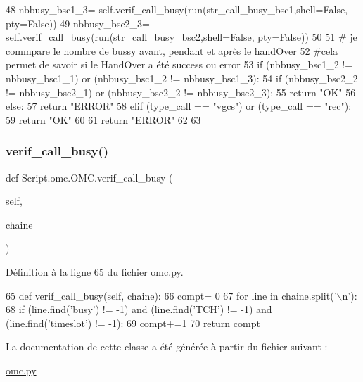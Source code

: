 \begin{DoxyCode}
{}
48             nbbusy\_bsc1\_3= self.verif\_call\_busy(run(str\_call\_busy\_bsc1,shell=\textcolor{keyword}{False}, pty=\textcolor{keyword}{False}))
49             nbbusy\_bsc2\_3= self.verif\_call\_busy(run(str\_call\_busy\_bsc2,shell=\textcolor{keyword}{False}, pty=\textcolor{keyword}{False}))
50             
51             \textcolor{comment}{# je commpare le nombre de bussy avant, pendant et après le handOver 
}
52             \textcolor{comment}{#cela permet de savoir si le HandOver a été success ou error
}
53             \textcolor{keywordflow}{if} (nbbusy\_bsc1\_2 != nbbusy\_bsc1\_1) \textcolor{keywordflow}{or} (nbbusy\_bsc1\_2 != nbbusy\_bsc1\_3):
54                 \textcolor{keywordflow}{if} (nbbusy\_bsc2\_2 != nbbusy\_bsc2\_1) \textcolor{keywordflow}{or} (nbbusy\_bsc2\_2 != nbbusy\_bsc2\_3):
55                     \textcolor{keywordflow}{return} \textcolor{stringliteral}{"OK"}
56                 \textcolor{keywordflow}{else}:
57                     \textcolor{keywordflow}{return} \textcolor{stringliteral}{"ERROR"}
58             \textcolor{keywordflow}{elif} (type\_call == \textcolor{stringliteral}{"vgcs"}) \textcolor{keywordflow}{or} (type\_call == \textcolor{stringliteral}{"rec"}):
59                 \textcolor{keywordflow}{return} \textcolor{stringliteral}{"OK"}
60 
61         \textcolor{keywordflow}{return} \textcolor{stringliteral}{"ERROR"}
62 
63 
\end{DoxyCode}
\mbox{\label{classScript_1_1omc_1_1OMC_ab6343718d0b1413540880ece035578f7}} 
\subsubsection{\texorpdfstring{verif\+\_\+call\+\_\+busy()}{verif\_call\_busy()}}
{\footnotesize\ttfamily def Script.\+omc.\+O\+M\+C.\+verif\+\_\+call\+\_\+busy (\begin{DoxyParamCaption}\item[{}]{self,  }\item[{}]{chaine }\end{DoxyParamCaption})}



Définition à la ligne 65 du fichier omc.\+py.


\begin{DoxyCode}
65     \textcolor{keyword}{def }verif\_call\_busy(self, chaine):
66         compt= 0
67         \textcolor{keywordflow}{for} line \textcolor{keywordflow}{in} chaine.split(\textcolor{stringliteral}{'\(\backslash\)n'}):
68             \textcolor{keywordflow}{if} (line.find(\textcolor{stringliteral}{'busy'}) != -1) \textcolor{keywordflow}{and} (line.find(\textcolor{stringliteral}{'TCH'}) != -1) \textcolor{keywordflow}{and} (line.find(\textcolor{stringliteral}{'timeslot'}) != -1):
69                 compt+=1
70         \textcolor{keywordflow}{return} compt
\end{DoxyCode}


La documentation de cette classe a été générée à partir du fichier suivant \+:\begin{DoxyCompactItemize}
\item 
\hyperlink{omc_8py}{omc.\+py}\end{DoxyCompactItemize}
